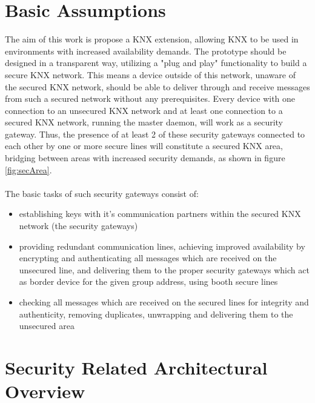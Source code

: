 \section{Basic Assumptions}

The aim of this work is propose a KNX extension, allowing KNX to be used in environments with increased availability demands. The prototype should be designed
in a transparent way, utilizing a "plug and play" functionality to build a secure KNX network.
This means a device outside of this network, unaware of
the secured KNX network, should be able to deliver through and receive messages from such a secured network without any prerequisites. 
Every device with one connection to an unsecured KNX network and at least one connection to a secured KNX network, running the master daemon, will work
as a security gateway. Thus, the presence of at least 2 of these security gateways connected to each other by one or more secure lines will constitute a 
secured KNX area, bridging between areas with increased security demands, as shown in figure \ref{fig:secArea}.
\\
\\
The basic tasks of such security gateways consist of:
\begin{itemize}
 \item establishing keys with it's communication partners within the secured KNX network (the security gateways)
 \item providing redundant communication lines, achieving improved availability by encrypting and authenticating all messages which are received on the unsecured line, and delivering them to the proper security gateways which act as
 border device for the given group address, using booth secure lines
 \item checking all messages which are received on the secured lines for integrity and authenticity, removing duplicates, unwrapping and delivering them to
 the unsecured area
\end{itemize}

\section{Security Related Architectural Overview}

